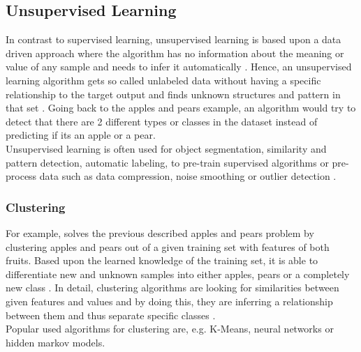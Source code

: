 \documentclass[MGS,Master,english]{twbook}%
\begin{document}
\subsection{Unsupervised Learning}
In contrast to supervised learning, unsupervised learning is based upon a data driven approach where the algorithm has no information about the meaning or value of any sample and needs to infer it automatically \cite{ml::book::developer}. Hence, an unsupervised learning algorithm gets so called unlabeled data without having a specific relationship to the target output and finds unknown structures and pattern in that set \cite{ai::book}. Going back to the apples and pears example, an algorithm would try to detect that there are 2 different types or classes in the dataset instead of predicting if its an apple or a pear.\\
Unsupervised learning is often used for object segmentation, similarity and pattern detection, automatic labeling, to pre-train supervised algorithms or pre-process data such as data compression, noise smoothing or outlier detection  \cite{ml::book::algorithms} \cite{ai::book}.

\subsubsection{Clustering}
For example, solves the previous described apples and pears problem by clustering apples and pears out of a given training set with features of both fruits. Based upon the learned knowledge of the training set, it is able to differentiate new and unknown samples into either apples, pears or a completely new class \cite{ai::book}. In detail, clustering algorithms are looking for similarities between given features and values and by doing this, they are inferring a relationship between them and thus separate specific classes \cite{ml::book::developer}.\\
Popular used algorithms for clustering are, e.g. K-Means, neural networks or hidden markov models. \cite{ml::book::developer}
\end{document}
